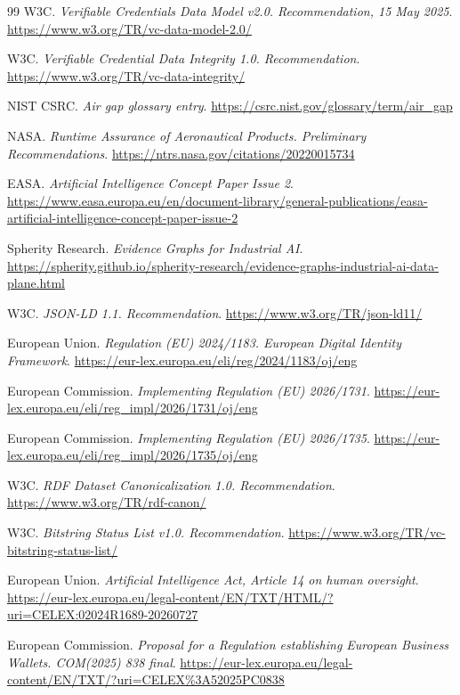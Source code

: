 \begin{thebibliography}{99}
W3C. \textit{Verifiable Credentials Data Model v2.0. Recommendation, 15 May 2025}.
\url{https://www.w3.org/TR/vc-data-model-2.0/}

W3C. \textit{Verifiable Credential Data Integrity 1.0. Recommendation}.
\url{https://www.w3.org/TR/vc-data-integrity/}

NIST CSRC. \textit{Air gap glossary entry}.
\url{https://csrc.nist.gov/glossary/term/air_gap}

NASA. \textit{Runtime Assurance of Aeronautical Products. Preliminary Recommendations}.
\url{https://ntrs.nasa.gov/citations/20220015734}

EASA. \textit{Artificial Intelligence Concept Paper Issue 2}.
\url{https://www.easa.europa.eu/en/document-library/general-publications/easa-artificial-intelligence-concept-paper-issue-2}

Spherity Research. \textit{Evidence Graphs for Industrial AI}.
\url{https://spherity.github.io/spherity-research/evidence-graphs-industrial-ai-data-plane.html}

W3C. \textit{JSON-LD 1.1. Recommendation}.
\url{https://www.w3.org/TR/json-ld11/}

European Union. \textit{Regulation (EU) 2024/1183. European Digital Identity Framework}.
\url{https://eur-lex.europa.eu/eli/reg/2024/1183/oj/eng}

European Commission. \textit{Implementing Regulation (EU) 2026/1731}.
\url{https://eur-lex.europa.eu/eli/reg_impl/2026/1731/oj/eng}

European Commission. \textit{Implementing Regulation (EU) 2026/1735}.
\url{https://eur-lex.europa.eu/eli/reg_impl/2026/1735/oj/eng}

W3C. \textit{RDF Dataset Canonicalization 1.0. Recommendation}.
\url{https://www.w3.org/TR/rdf-canon/}

W3C. \textit{Bitstring Status List v1.0. Recommendation}.
\url{https://www.w3.org/TR/vc-bitstring-status-list/}

European Union. \textit{Artificial Intelligence Act, Article 14 on human oversight}.
\url{https://eur-lex.europa.eu/legal-content/EN/TXT/HTML/?uri=CELEX:02024R1689-20260727}

European Commission. \textit{Proposal for a Regulation establishing European Business Wallets. COM(2025) 838 final}.
\url{https://eur-lex.europa.eu/legal-content/EN/TXT/?uri=CELEX%3A52025PC0838}


\end{thebibliography}
